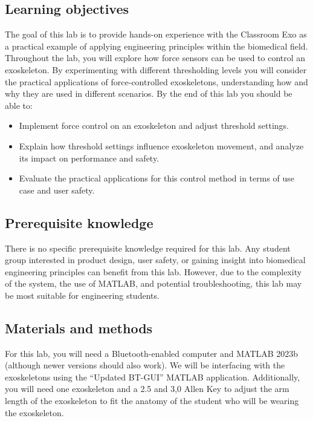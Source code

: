 \subsection{Learning objectives}
The goal of this lab is to provide hands-on experience with the Classroom Exo as a practical example of applying engineering principles within the biomedical field. Throughout the lab, you will explore how force sensors can be used to control an exoskeleton. By experimenting with different thresholding levels you will consider the practical applications of force-controlled exoskeletons, understanding how and why they are used in different scenarios. By the end of this lab you should be able to:

\begin{itemize}[]
	\item Implement force control on an exoskeleton and adjust threshold settings.
	\item Explain how threshold settings influence exoskeleton movement, and analyze its impact on performance and safety. 
	\item Evaluate the practical applications for this control method in terms of use case and user safety.	
\end{itemize}

\subsection{Prerequisite knowledge}
There is no specific prerequisite knowledge required for this lab. Any student group interested in product design, user safety, or gaining insight into biomedical engineering principles can benefit from this lab. However, due to the complexity of the system, the use of MATLAB, and potential troubleshooting, this lab may be most suitable for engineering students.

\subsection{Materials and methods}
For this lab, you will need a Bluetooth-enabled computer and MATLAB 2023b (although newer versions should also work). We will be interfacing with the exoskeletons using the “Updated BT-GUI” MATLAB application. Additionally, you will need one exoskeleton and a 2.5 and 3,0 Allen Key to adjust the arm length of the exoskeleton to fit the anatomy of the student who will be wearing the exoskeleton. 


